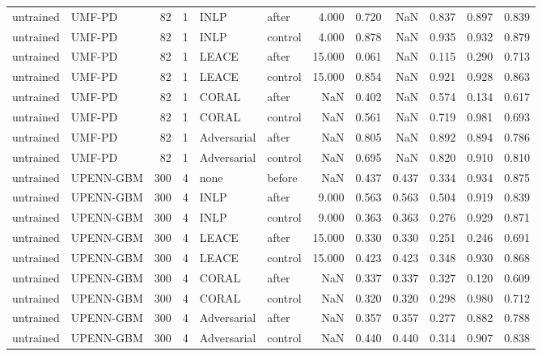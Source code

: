 \begin{tabular}{llrrllrrrrrr}
untrained & UMF-PD & 82 & 1 & INLP & after & 4.000 & 0.720 & NaN & 0.837 & 0.897 & 0.839 \\
untrained & UMF-PD & 82 & 1 & INLP & control & 4.000 & 0.878 & NaN & 0.935 & 0.932 & 0.879 \\
untrained & UMF-PD & 82 & 1 & LEACE & after & 15.000 & 0.061 & NaN & 0.115 & 0.290 & 0.713 \\
untrained & UMF-PD & 82 & 1 & LEACE & control & 15.000 & 0.854 & NaN & 0.921 & 0.928 & 0.863 \\
untrained & UMF-PD & 82 & 1 & CORAL & after & NaN & 0.402 & NaN & 0.574 & 0.134 & 0.617 \\
untrained & UMF-PD & 82 & 1 & CORAL & control & NaN & 0.561 & NaN & 0.719 & 0.981 & 0.693 \\
untrained & UMF-PD & 82 & 1 & Adversarial & after & NaN & 0.805 & NaN & 0.892 & 0.894 & 0.786 \\
untrained & UMF-PD & 82 & 1 & Adversarial & control & NaN & 0.695 & NaN & 0.820 & 0.910 & 0.810 \\
untrained & UPENN-GBM & 300 & 4 & none & before & NaN & 0.437 & 0.437 & 0.334 & 0.934 & 0.875 \\
untrained & UPENN-GBM & 300 & 4 & INLP & after & 9.000 & 0.563 & 0.563 & 0.504 & 0.919 & 0.839 \\
untrained & UPENN-GBM & 300 & 4 & INLP & control & 9.000 & 0.363 & 0.363 & 0.276 & 0.929 & 0.871 \\
untrained & UPENN-GBM & 300 & 4 & LEACE & after & 15.000 & 0.330 & 0.330 & 0.251 & 0.246 & 0.691 \\
untrained & UPENN-GBM & 300 & 4 & LEACE & control & 15.000 & 0.423 & 0.423 & 0.348 & 0.930 & 0.868 \\
untrained & UPENN-GBM & 300 & 4 & CORAL & after & NaN & 0.337 & 0.337 & 0.327 & 0.120 & 0.609 \\
untrained & UPENN-GBM & 300 & 4 & CORAL & control & NaN & 0.320 & 0.320 & 0.298 & 0.980 & 0.712 \\
untrained & UPENN-GBM & 300 & 4 & Adversarial & after & NaN & 0.357 & 0.357 & 0.277 & 0.882 & 0.788 \\
untrained & UPENN-GBM & 300 & 4 & Adversarial & control & NaN & 0.440 & 0.440 & 0.314 & 0.907 & 0.838 \\
\bottomrule
\end{tabular}
